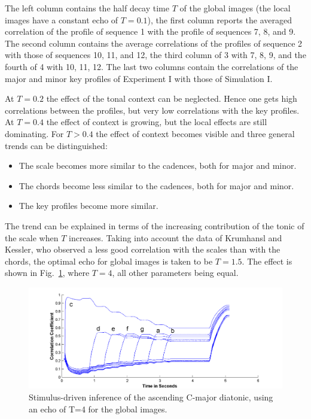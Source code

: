 The left column contains the half decay time $T$ of the global
images (the local images have a constant echo of $T=0.1$), the
first column reports the averaged correlation of the profile of
sequence 1 with the profile of sequences 7, 8, and 9. The second
column contains the average correlations of the profiles of
sequence 2 with those of sequences 10, 11, and 12, the third
column of 3 with 7, 8, 9, and the fourth of 4 with 10, 11, 12. The
last two columns contain the correlations of the major and minor
key profiles of Experiment I with those of Simulation I.

At $T=0.2$ the effect of the tonal context can be neglected. Hence
one gets high correlations between the profiles, but very low
correlations with the key profiles.  At $T=0.4$ the effect of
context is growing, but the local effects are still dominating.
For $T > 0.4$ the effect of context becomes visible and three
general trends can be distinguished:
\begin{itemize}
\item
The scale becomes more similar to the cadences, both for major and
minor.
\item
The chords become less similar to the cadences, both for major and
minor.
\item
The key profiles become more similar.
\end{itemize}
The trend can be explained in terms of the increasing contribution
of the tonic of the scale when $T$ increases. Taking into account
the data of Krumhansl and Kessler, who observed a less good
correlation with the scales than with the chords, the optimal echo
for global images is taken to be $T=1.5$. The effect is shown in
Fig.~\ref{Fig:TonalityDemoFig9}, where $T=4$, all other parameters
being equal.
\begin{figure}[h]
    \centering
    \includegraphics[width=\IPEMDefaultFigureWidth]{Graphics/TonalityDemoFig9}
    \caption{Stimulus-driven inference of the ascending C-major diatonic,
     using an echo of T=4 for the global images.}
    \label{Fig:TonalityDemoFig9}
\end{figure}


